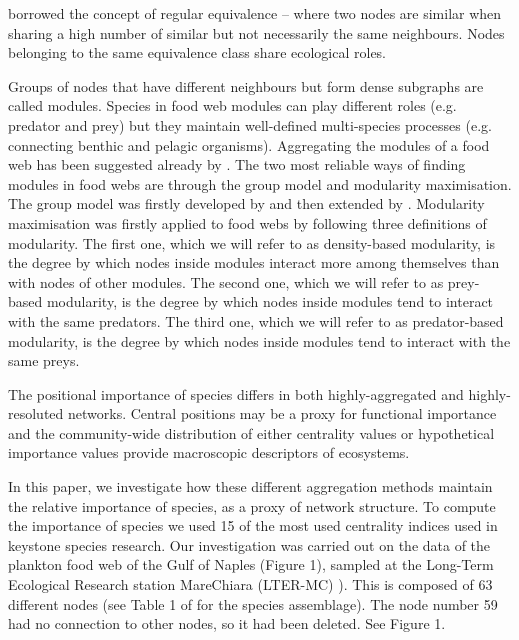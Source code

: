 \documentclass[twocolumn]{article}
\begin{document}
	\citet{Luczkovich2003} borrowed the concept of regular equivalence – where two nodes are similar when sharing a high number of similar but not necessarily the same neighbours. Nodes belonging to the same equivalence class share ecological roles.
	\par
	Groups of nodes that have different neighbours but form dense subgraphs are called modules. Species in food web modules can play different roles (e.g. predator and prey) but they maintain well-defined multi-species processes (e.g. connecting benthic and pelagic organisms). Aggregating the modules of a food web has been suggested already by \citet{Allesina2009a}.
	The two most reliable ways of finding modules in food webs are through the group model and modularity maximisation. The group model was firstly developed by \citet{Allesina2009a} and then extended by \citet{Sander2015}.	Modularity maximisation was firstly applied to food webs by \citet{Guimera2010} following three definitions of modularity.	The first one, which we will refer to as density-based modularity, is the degree by which nodes inside modules interact more among themselves than with nodes of other modules.	The second one, which we will refer to as prey-based modularity, is the degree by which nodes inside modules tend to interact with the same predators.	The third one, which we will refer to as predator-based modularity, is the degree by which nodes inside modules tend to interact with the same preys.
	\par
	The positional importance of species differs in both highly-aggregated and highly-resoluted networks. Central positions may be a proxy for functional importance and the community-wide distribution of either centrality values \citep{Bauer2010} or hypothetical importance values \citep{Mills1993} provide macroscopic descriptors of ecosystems.
	\par
	In this paper, we investigate how these different aggregation methods maintain the relative importance of species, as a proxy of network structure.
	To compute the importance of species we used 15 of the most used centrality indices used in keystone species research.
	Our investigation was carried out on the data of the plankton food web of the Gulf of Naples (Figure 1), sampled at the Long-Term Ecological Research station MareChiara (LTER-MC) \citep{RiberadAlcala2004}). This is composed of 63 different nodes (see Table 1 of \citet{DAlelio2016} for the species assemblage). The node number 59 had no connection to other nodes, so it had been deleted. See Figure 1.
\end{document}
